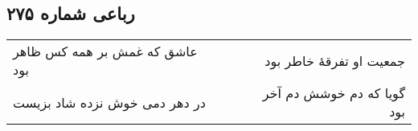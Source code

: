 \begin{center}
\section*{رباعی شماره ۲۷۵}
\label{sec:sh275}
\begin{longtable}{l p{0.5cm} r}
عاشق که غمش بر همه کس ظاهر بود
&&
جمعیت او تفرقهٔ خاطر بود
\\
در دهر دمی خوش نزده شاد بزیست
&&
گویا که دم خوشش دم آخر بود
\\
\end{longtable}
\end{center}
